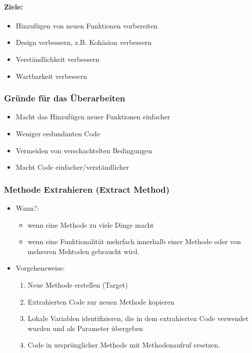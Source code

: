 \documentclass[ngerman,color=3b]{tuda_summary}
\begin{document}
\paragraph{Ziele:}\begin{itemize}
    \item Hinzufügen von neuen Funktionen vorbereiten
    \item Design verbessern, z.B. Kohäsion verbessern
    \item Verständlichkeit verbessern
    \item Wartbarkeit verbessern
\end{itemize}
\subsubsection{Gründe für das Überarbeiten}
\begin{itemize}
    \item Macht das Hinzufügen neuer Funktionen einfacher
    \item Weniger eedundanten Code
    \item Vermeiden von verschachtelten Bedingungen
    \item Macht Code einfacher/verständlicher
\end{itemize}
\subsubsection{Methode Extrahieren (Extract Method)}
\begin{itemize}
    \item Wann?: \begin{itemize}
              \item wenn eine Methode zu viele Dinge macht
              \item wenn eine Funktionalität mehrfach innerhalb einer Methode oder von mehreren Mehtoden gebraucht wird.
          \end{itemize}
    \item Vorgehensweise:\begin{enumerate}
              \item Neue Methode erstellen (Target)
              \item Extrahierten Code zur neuen Methode kopieren
              \item Lokale Variablen identifizieren, die in dem extrahierten Code verwendet wurden und als Parameter übergeben
              \item Code in ursprünglicher Methode mit Methodenaufruf ersetzen.
          \end{enumerate}
\end{itemize}
\clearpage
\end{document}
